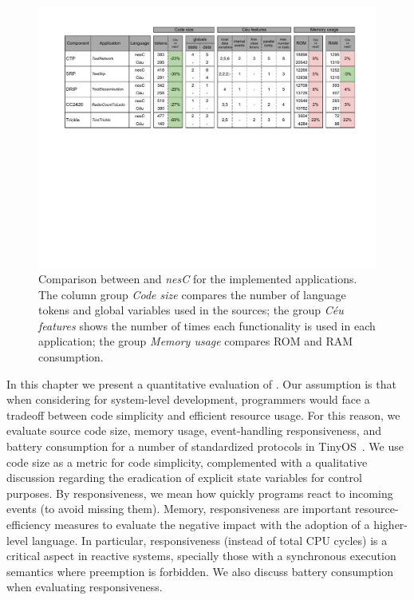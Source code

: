 %

\begin{figure}[t]
\includegraphics[width=\textwidth]{eval}
\caption{ Comparison between \CEU and \emph{nesC} for the implemented 
applications. \newline
{\small %
The column group \emph{Code size} compares the number of language tokens and 
global variables used in the sources;
the group \emph{C\'eu features} shows the number of times each functionality is 
used in each application;
the group \emph{Memory usage} compares ROM and RAM consumption.
}%
\label{fig.eval}
}
\end{figure}

In this chapter we present a quantitative evaluation of \CEU.
%
Our assumption is that when considering \CEU for system-level development, 
programmers would face a tradeoff between code simplicity and efficient 
resource usage.
%
For this reason, we evaluate source code size, memory usage, event-handling 
responsiveness, and battery consumption for a number of standardized protocols 
in TinyOS~\cite{wsn.teps}.
%
We use code size as a metric for code simplicity, complemented with a 
qualitative discussion regarding the eradication of explicit state variables 
for control purposes.
%
By responsiveness, we mean how quickly programs react to incoming events (to 
avoid missing them).
%
Memory, responsiveness are important resource-efficiency measures to evaluate 
the negative impact with the adoption of a higher-level language.
%
In particular, responsiveness (instead of total CPU cycles) is a critical 
aspect in reactive systems, specially those with a synchronous execution 
semantics where preemption is forbidden.
%
We also discuss battery consumption when evaluating responsiveness.

